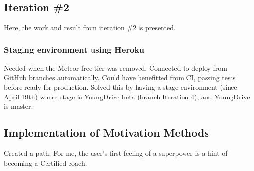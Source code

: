 \subsection{Iteration \#2}
Here, the work and result from iteration \#2 is presented.

\subsubsection{Staging environment using Heroku}
Needed when the Meteor free tier was removed. Connected to deploy from GitHub branches automatically. Could have benefitted from CI, passing tests before ready for production. Solved this by having a stage environment (since April 19th) where stage is YoungDrive-beta (branch Iteration 4), and YoungDrive is master.

\subsection{Implementation of Motivation Methods}

Created a path. For me, the user's first feeling of a superpower is a hint of becoming a Certified coach. 
